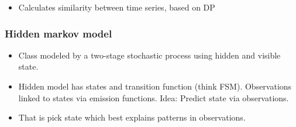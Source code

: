\begin{itemize}
		\item Calculates similarity between time series, based on DP
\end{itemize}

\subsubsection{Hidden markov model}

\begin{itemize}
		\item Class modeled by a two-stage stochastic process using hidden and
				visible state.
		\item Hidden model has states and transition function (think FSM).
				Observations linked to states via emission functions. Idea:
				Predict state via observations.
		\item That is pick state which best explains patterns in observations.
\end{itemize}
